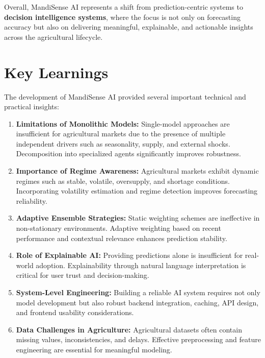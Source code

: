\documentclass[12pt,a4paper]{report}
\begin{document}
Overall, MandiSense AI represents a shift from prediction-centric systems to \textbf{decision intelligence systems}, where the focus is not only on forecasting accuracy but also on delivering meaningful, explainable, and actionable insights across the agricultural lifecycle.

\section{Key Learnings}

The development of MandiSense AI provided several important technical and practical insights:

\begin{enumerate}
    \item \textbf{Limitations of Monolithic Models:}  
    Single-model approaches are insufficient for agricultural markets due to the presence of multiple independent drivers such as seasonality, supply, and external shocks. Decomposition into specialized agents significantly improves robustness.

    \item \textbf{Importance of Regime Awareness:}  
    Agricultural markets exhibit dynamic regimes such as stable, volatile, oversupply, and shortage conditions. Incorporating volatility estimation and regime detection improves forecasting reliability.

    \item \textbf{Adaptive Ensemble Strategies:}  
    Static weighting schemes are ineffective in non-stationary environments. Adaptive weighting based on recent performance and contextual relevance enhances prediction stability.

    \item \textbf{Role of Explainable AI:}  
    Providing predictions alone is insufficient for real-world adoption. Explainability through natural language interpretation is critical for user trust and decision-making.

    \item \textbf{System-Level Engineering:}  
    Building a reliable AI system requires not only model development but also robust backend integration, caching, API design, and frontend usability considerations.

    \item \textbf{Data Challenges in Agriculture:}  
    Agricultural datasets often contain missing values, inconsistencies, and delays. Effective preprocessing and feature engineering are essential for meaningful modeling.

\end{enumerate}
\end{document}
